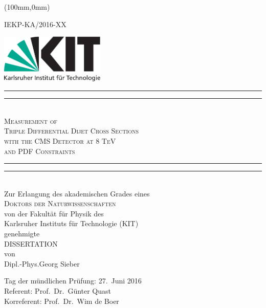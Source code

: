 \begin{titlepage}
    \begin{center}
        \begin{textblock*}{5cm}(100mm,0mm)
            \begin{flushright}
                \small
                IEKP-KA/2016-XX
            \end{flushright}
        \end{textblock*}
        \includegraphics[width=5.0cm]{figures/Kitlogo_de_cmyk}
        \vspace*{2cm}

        \vspace*{\baselineskip}
        \rule{\textwidth}{1.6pt}\vspace*{-\baselineskip}\vspace*{2pt}
        \rule{\textwidth}{0.4pt}\\[\baselineskip]
        \LARGE{\textsc{Measurement of\\
            Triple Differential Dijet Cross Sections\\
            with the CMS Detector at 8 TeV\\
            and PDF Constraints}}\\
        \rule{\textwidth}{0.4pt}\vspace*{-\baselineskip}\vspace{3.2pt}
        \rule{\textwidth}{1.6pt}\\[\baselineskip]
        \vspace{6ex}
        \large Zur Erlangung des akademischen Grades eines\\[2.5ex]
        \textsc{Doktors der Naturwissenschaften}\\[2.5ex]
            von der Fakult\"at f\"ur Physik des\\
        Karlsruher Instituts f\"ur Technologie (KIT)\\ 
        genehmigte\\
        \vspace{2.5ex}
        DISSERTATION\\
        \vspace{2.5ex}
        von\\
        \vspace{2ex}
        Dipl.-Phys.\;Georg Sieber\\

    \end{center}
\vspace{\fill}
Tag der mündlichen Prüfung: 27.\ Juni 2016\\[1.5ex]
Referent: Prof.\ Dr.\ Günter Quast\\[0.5ex]
Korreferent: Prof.\ Dr.\ Wim de Boer

\end{titlepage}
\cleardoublepage
